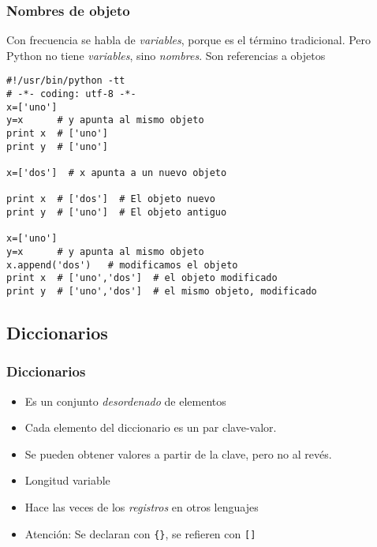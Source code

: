 \documentclass[ucs]{beamer}
\begin{document}
\begin{frame}[fragile]
\frametitle{Nombres de objeto}
Con frecuencia se habla de \emph{variables}, porque es el
término tradicional. Pero
Python no tiene \emph{variables}, sino \emph{nombres}. Son referencias
a objetos

  \begin{scriptsize}
  \begin{verbatim}
#!/usr/bin/python -tt
# -*- coding: utf-8 -*-
x=['uno']
y=x      # y apunta al mismo objeto
print x  # ['uno']
print y  # ['uno']

x=['dos']  # x apunta a un nuevo objeto

print x  # ['dos']  # El objeto nuevo
print y  # ['uno']  # El objeto antiguo

x=['uno']
y=x      # y apunta al mismo objeto
x.append('dos')   # modificamos el objeto
print x  # ['uno','dos']  # el objeto modificado
print y  # ['uno','dos']  # el mismo objeto, modificado
  \end{verbatim}
  \end{scriptsize}

\end{frame}



\subsection{Diccionarios}

\begin{frame}[fragile]
\frametitle{Diccionarios}  

\begin{itemize}
\item Es un conjunto \emph{desordenado} de elementos 
\item Cada elemento del diccionario es un par clave-valor. 
\item Se pueden obtener valores a partir de la clave, pero no al revés.
\item Longitud variable
\item Hace las veces de los \emph{registros} en otros lenguajes
\item Atención: Se declaran con \verb|{}|, se refieren con \verb|[]|
\end{itemize}
\end{frame}
\end{document}
